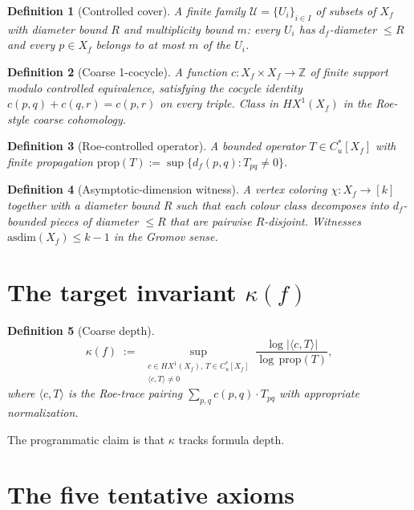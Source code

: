 \documentclass[11pt,a4paper]{article}
\newtheorem{definition}{Definition}
\begin{document}
\begin{definition}[Controlled cover]\label{def:cover}
A finite family $\mathcal{U} = \{U_i\}_{i \in I}$ of subsets of $X_f$
with diameter bound $R$ and multiplicity bound $m$: every $U_i$ has
$d_f$-diameter $\leq R$ and every $p \in X_f$ belongs to at most $m$
of the $U_i$.
\end{definition}

\begin{definition}[Coarse 1-cocycle]
A function $c \colon X_f \times X_f \to \mathbb{Z}$ of finite support
modulo controlled equivalence, satisfying the cocycle identity
$c(p, q) + c(q, r) = c(p, r)$ on every triple. Class in $HX^1(X_f)$ in
the Roe-style coarse cohomology.
\end{definition}

\begin{definition}[Roe-controlled operator]
A bounded operator $T \in C^*_u[X_f]$ with finite \emph{propagation}
$\mathrm{prop}(T) := \sup\{d_f(p,q) : T_{pq} \neq 0\}$.
\end{definition}

\begin{definition}[Asymptotic-dimension witness]\label{def:asdim}
A vertex coloring $\chi \colon X_f \to [k]$ together with a diameter
bound $R$ such that each colour class decomposes into $d_f$-bounded
pieces of diameter $\leq R$ that are pairwise $R$-disjoint. Witnesses
$\mathrm{asdim}(X_f) \leq k - 1$ in the Gromov sense.
\end{definition}

\section{The target invariant $\kappa(f)$}\label{sec:kappa}

\begin{definition}[Coarse depth]
\[
\kappa(f)
\;:=\;
\sup_{\substack{c \in HX^1(X_f),\, T \in C^*_u[X_f] \\ \langle c, T\rangle \neq 0}}
\frac{\log\bigl|\langle c, T\rangle\bigr|}{\log\,\mathrm{prop}(T)},
\]
where $\langle c, T \rangle$ is the Roe-trace pairing
$\sum_{p, q} c(p,q) \cdot T_{pq}$ with appropriate normalization.
\end{definition}

The programmatic claim is that $\kappa$ tracks formula depth.

\section{The five tentative axioms}\label{sec:axioms}
\end{document}
